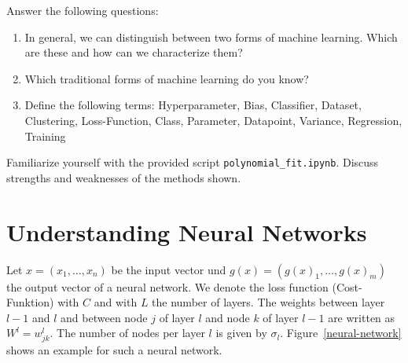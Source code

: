 Answer the following questions:
\begin{enumerate}
    \item In general, we can distinguish between two forms of machine learning.
    Which are these and how can we characterize them?
    \item Which traditional forms of machine learning do you know?
    \item Define the following terms:
    Hyperparameter, Bias, Classifier, Dataset, Clustering, Loss-Function, Class, Parameter, Datapoint, Variance, Regression, Training
\end{enumerate}
%
%
Familiarize yourself with the provided script \texttt{polynomial_fit.ipynb}.
Discuss strengths and weaknesses of the methods shown.
%
%
\section*{Understanding Neural Networks}
Let $x=(x_1,\dots,x_n)$ be the input vector und $g(x)=(g(x)_1,\dots,g(x)_m)$ the output vector of a neural network.
We denote the loss function (Cost-Funktion) with $C$ and with $L$ the number of layers.
The weights between layer $l-1$ and $l$ and between node $j$ of layer $l$ and node $k$ of layer $l-1$ are written as $W^l=w^l_{jk}$.
The number of nodes per layer $l$ is given by $\sigma_l$.
Figure~\ref{neural-network} shows an example for such a neural network.
